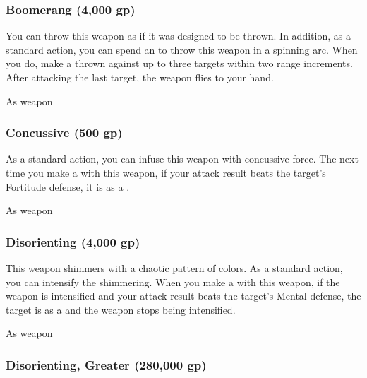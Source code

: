
\lowercase{\hypertarget{item:Boomerang}{}}\label{item:Boomerang}
\hypertarget{item:Boomerang}{\subsubsection{Boomerang\hfill{} (4,000 gp)}}

You can throw this weapon as if it was designed to be thrown.
In addition, as a standard action, you can spend an  to throw this weapon in a spinning arc.
When you do, make a thrown  against up to three targets within two range increments.
After attacking the last target, the weapon flies to your hand.



 As weapon


\lowercase{\hypertarget{item:Concussive}{}}\label{item:Concussive}
\hypertarget{item:Concussive}{\subsubsection{Concussive\hfill{} (500 gp)}}

As a standard action, you can infuse this weapon with concussive force.
The next time you make a  with this weapon, if your attack result beats the target's Fortitude defense, it is  as a .



 As weapon


\lowercase{\hypertarget{item:Disorienting}{}}\label{item:Disorienting}
\hypertarget{item:Disorienting}{\subsubsection{Disorienting\hfill{} (4,000 gp)}}

This weapon shimmers with a chaotic pattern of colors.
As a standard action, you can intensify the shimmering.
When you make a  with this weapon, if the weapon is intensified and your attack result beats the target's Mental defense,
the target is \disoriented as a  and the weapon stops being intensified.



 


 As weapon


\lowercase{\hypertarget{item:Disorienting, Greater}{}}\label{item:Disorienting, Greater}
\hypertarget{item:Disorienting, Greater}{\subsubsection{Disorienting, Greater\hfill{} (280,000 gp)}}

